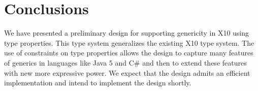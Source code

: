 \documentclass[nocopyrightspace,9pt]{sigplanconf}
\begin{document}
\section{Conclusions}

We have presented a preliminary design for supporting genericity
in X10 using type properties.  This type system generalizes the
existing X10 type system.  The use of constraints on type
properties allows
the design to capture many features of generics in languages
like Java 5 and C\# and then to extend these features with new
more expressive power.
We expect that the design admits an efficient
implementation and intend to implement the design shortly.

\newpage





% 
\end{document}
